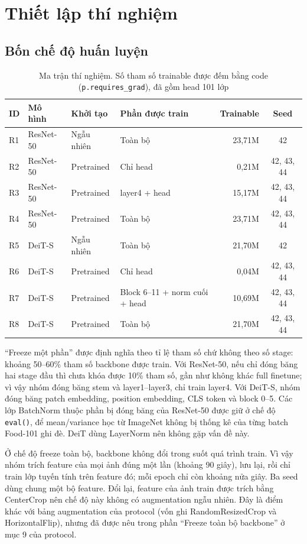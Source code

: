 \documentclass[12pt,a4paper]{article}
\begin{document}
\section{Thiết lập thí nghiệm}

\subsection{Bốn chế độ huấn luyện}

\begin{table}[H]
\centering
\caption{Ma trận thí nghiệm. Số tham số trainable được đếm bằng code
(\texttt{p.requires\_grad}), đã gồm head 101 lớp}
\label{tab:matrix}
\small
\begin{tabular}{llllrc}
\toprule
ID & Mô hình & Khởi tạo & Phần được train & Trainable & Seed \\
\midrule
R1 & ResNet-50 & Ngẫu nhiên & Toàn bộ & 23,71M & 42 \\
R2 & ResNet-50 & Pretrained & Chỉ head & 0,21M & 42, 43, 44 \\
R3 & ResNet-50 & Pretrained & layer4 + head & 15,17M & 42, 43, 44 \\
R4 & ResNet-50 & Pretrained & Toàn bộ & 23,71M & 42, 43, 44 \\
\midrule
R5 & DeiT-S & Ngẫu nhiên & Toàn bộ & 21,70M & 42 \\
R6 & DeiT-S & Pretrained & Chỉ head & 0,04M & 42, 43, 44 \\
R7 & DeiT-S & Pretrained & Block 6--11 + norm cuối + head & 10,69M & 42, 43, 44 \\
R8 & DeiT-S & Pretrained & Toàn bộ & 21,70M & 42, 43, 44 \\
\bottomrule
\end{tabular}
\end{table}

``Freeze một phần'' được định nghĩa theo tỉ lệ tham số chứ không theo số stage:
khoảng 50--60\% tham số backbone được train. Với ResNet-50, nếu chỉ đóng băng hai
stage đầu thì chưa khóa được 10\% tham số, gần như không khác full finetune; vì vậy
nhóm đóng băng stem và layer1--layer3, chỉ train layer4. Với DeiT-S, nhóm đóng băng
patch embedding, position embedding, CLS token và block 0--5. Các lớp BatchNorm thuộc
phần bị đóng băng của ResNet-50 được giữ ở chế độ \texttt{eval()}, để mean/variance
học từ ImageNet không bị thống kê của từng batch Food-101 ghi đè. DeiT dùng
LayerNorm nên không gặp vấn đề này.

Ở chế độ freeze toàn bộ, backbone không đổi trong suốt quá trình train. Vì vậy nhóm
trích feature của mọi ảnh đúng một lần (khoảng 90 giây), lưu lại, rồi chỉ train lớp
tuyến tính trên feature đó; mỗi epoch chỉ còn khoảng nửa giây. Ba seed dùng chung
một bộ feature. Đổi lại, feature của ảnh train được trích bằng CenterCrop nên chế
độ này không có augmentation ngẫu nhiên. Đây là điểm khác với bảng augmentation của
protocol (vốn ghi RandomResizedCrop và HorizontalFlip), nhưng đã được nêu trong phần
``Freeze toàn bộ backbone'' ở mục 9 của protocol.
\end{document}
